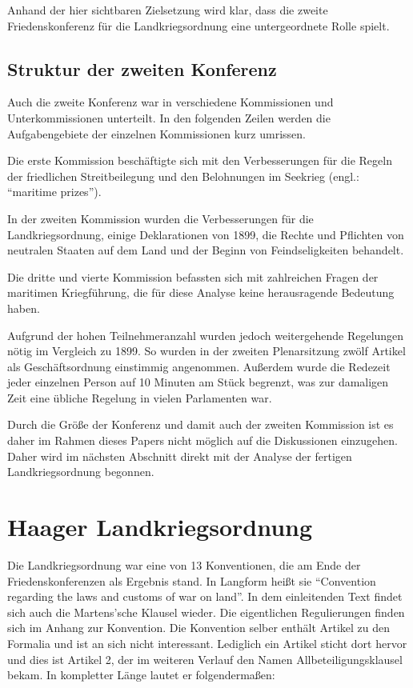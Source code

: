 \documentclass[12pt]{scrartcl}
\begin{document}
Anhand der hier sichtbaren Zielsetzung wird klar, dass die zweite Friedenskonferenz für die Landkriegsordnung eine untergeordnete Rolle spielt.

\subsection{Struktur der zweiten Konferenz}

Auch die zweite Konferenz war in verschiedene Kommissionen und Unterkommissionen unterteilt. In den folgenden Zeilen werden die Aufgabengebiete der einzelnen Kommissionen kurz umrissen.

Die erste Kommission beschäftigte sich mit den Verbesserungen für die Regeln der friedlichen Streitbeilegung und den Belohnungen im Seekrieg (engl.: "`maritime prizes"').

In der zweiten Kommission wurden die Verbesserungen für die Landkriegsordnung, einige Deklarationen von 1899, die Rechte und Pflichten von neutralen Staaten auf dem Land und der Beginn von Feindseligkeiten behandelt.

Die dritte und vierte Kommission befassten sich mit zahlreichen Fragen der maritimen Kriegführung, die für diese Analyse keine herausragende Bedeutung haben. 

Aufgrund der hohen Teilnehmeranzahl wurden jedoch weitergehende Regelungen nötig im Vergleich zu 1899. So wurden in der zweiten Plenarsitzung zwölf Artikel als Geschäftsordnung einstimmig angenommen. Außerdem wurde die Redezeit jeder einzelnen Person auf 10 Minuten am Stück begrenzt, was zur damaligen Zeit eine übliche Regelung in vielen Parlamenten war.\cite{Scott-V1-1921}

Durch die Größe der Konferenz und damit auch der zweiten Kommission ist es daher im Rahmen dieses Papers nicht möglich auf die Diskussionen einzugehen. Daher wird im nächsten Abschnitt direkt mit der Analyse der fertigen Landkriegsordnung begonnen.

\section{Haager Landkriegsordnung}

Die Landkriegsordnung war eine von 13 Konventionen, die am Ende der Friedenskonferenzen als Ergebnis stand. In Langform heißt sie "`Convention regarding the laws and customs of war on land"'\cite{Scott-V1-1921}. In dem einleitenden Text findet sich auch die Martens'sche Klausel wieder. Die eigentlichen Regulierungen finden sich im Anhang zur Konvention. Die Konvention selber enthält Artikel zu den Formalia und ist an sich nicht interessant. Lediglich ein Artikel sticht dort hervor und dies ist Artikel 2, der im weiteren Verlauf den Namen Allbeteiligungsklausel bekam. In kompletter Länge lautet er folgendermaßen:
\end{document}

